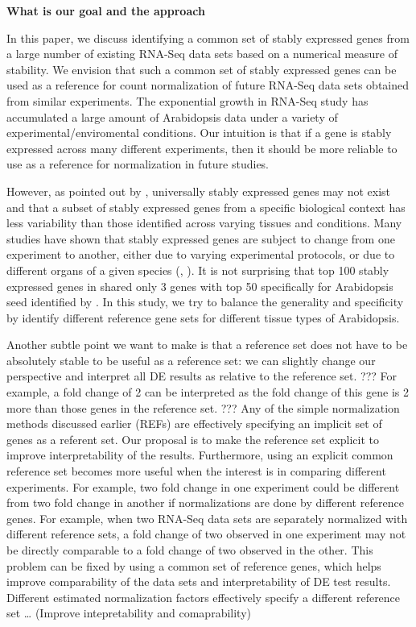 \documentclass[11pt, a4paper]{article}
\begin{document}
\textbf{What is our goal and the approach} 

In this paper, we discuss identifying a common set of stably expressed genes
from a large number of  existing RNA-Seq data sets based on a numerical
measure of stability.  We envision that such a common set of stably expressed
genes can be used as a reference for count normalization of future RNA-Seq
data sets obtained from similar experiments. The exponential growth in RNA-Seq
study has accumulated a large amount of Arabidopsis data under a variety of
experimental/enviromental conditions.  Our intuition is that if a gene is
stably expressed across many different experiments, then it should be more
reliable to use as a reference for normalization in future studies.

However, as pointed out by \cite{hruz2011refgenes}, universally stably
expressed genes may not exist and that a subset of stably expressed genes from
a specific biological context has less variability than those identified
across varying tissues and conditions.  Many studies have shown that stably
expressed genes are subject to change from one experiment to another, either
due to varying experimental protocols, or due to different organs of a given
species (\cite{reid2006optimized}, \cite{hong2010identification}).  It is not
surprising that top 100 stably expressed genes in \cite{czechowski2005genome}
shared only 3 genes with top 50 specifically for Arabidopsis seed identified
by \cite{dekkers2012identification}. In this study, we try to balance the
generality and specificity by identify different reference gene sets for
different tissue types of Arabidopsis.

Another subtle point we want to make is that a reference set does not have to
be absolutely stable to be useful as a reference set: we can slightly change
our perspective and interpret all DE results as relative to the reference set.
??? For example, a fold change of 2 can be interpreted as the fold change of
this gene is 2 more than those genes in the reference set. ???  Any of the
simple normalization methods discussed earlier (REFs) are effectively
specifying an implicit set of genes as a referent set. Our proposal is to make
the reference set explicit to improve interpretability of the results.
Furthermore, using an explicit common reference set becomes more useful when
the interest is in comparing different experiments.  For example, two fold
change in one experiment could be different from two fold change in another if
normalizations are done by different reference genes.  For example, when two
RNA-Seq data sets are separately normalized with different reference sets, a
fold change of two observed in one experiment may not be directly comparable
to a fold change of two observed in the other.  This problem can be fixed by
using a common set of reference genes, which helps improve comparability of
the data sets and interpretability of DE test results. Different estimated
normalization factors effectively specify a different reference set \ldots
(Improve intepretability and comaprability)
\end{document}
